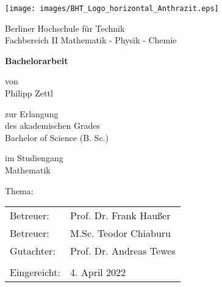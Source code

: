 \begin{titlepage}
    \begin{center}
        \vspace*{1cm}
\begin{center}
    \texttt{[image: images/BHT\_Logo\_horizontal\_Anthrazit.eps]}
\end{center}

        Berliner Hochschule für Technik\\
        \vspace{1cm}
        Fachbereich II Mathematik - Physik - Chemie

        \vspace{1.5cm}

        \textbf{Bachelorarbeit}

        \vspace{0.75cm}
        von\\
        \vspace{0.5cm}
        Philipp Zettl\\
        \vspace{0.75cm}

        zur Erlangung\\
        des akademischen Grades\\
        \vspace{.5cm}
        Bachelor of Science (B. Sc.)\\

        \vspace{0.75cm}

        im Studiengang\\
        Mathematik
    \end{center}

    \vspace{1.5cm}
    {
        \raggedleft
        Thema:
    }
    \begin{center}
    \begin{minipage}{.7\textwidth}
            \thesisTitle
    \end{minipage}
    \end{center}
    \vspace{1.5cm}
    {
        \begin{tabular}{l l}
            Betreuer: & Prof. Dr. Frank Haußer\\
            Betreuer: & M.Sc. Teodor Chiaburu\\
            Gutachter: & Prof. Dr. Andreas Tewes\\
            \\
            Eingereicht: & 4. April 2022
        \end{tabular}
    }
\end{titlepage}

